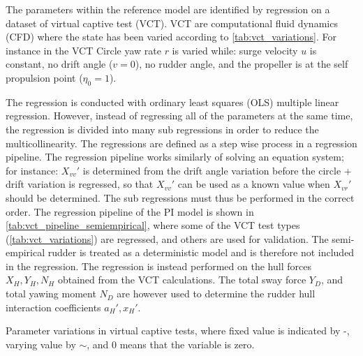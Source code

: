The parameters within the reference model are identified by regression on a dataset \citep{marimon_giovannetti_effects_2020} of virtual captive test (VCT). VCT are computational fluid dynamics (CFD) where the state has been varied according to \autoref{tab:vct_variations}. For instance in the VCT Circle yaw rate $r$ is varied while: surge velocity $u$ is constant, no drift angle ($v=0$), no rudder angle, and the propeller is at the self propulsion point ($\eta_0=1$).

The regression is conducted with ordinary least squares (OLS) multiple linear regression. However, instead of regressing all of the parameters at the same time, the regression is divided into many sub regressions in order to reduce the multicollinearity. The regressions are defined as a step wise process in a regression pipeline. 
The regression pipeline works similarly of solving an equation system; for instance: ${X_{vv}}'$ is determined from the drift angle variation before the circle + drift variation is regressed, so that ${X_{vv}}'$ can be used as a known value when ${X_{vr}}'$ should be determined. The sub regressions must thus be performed in the correct order. 
The regression pipeline of the PI model is shown in \autoref{tab:vct_pipeline_semiempirical}, where some of the VCT test types (\autoref{tab:vct_variations}) are regressed, and others are used for validation. The semi-empirical rudder is treated as a deterministic model and is therefore not included in the regression. The regression is instead performed on the hull forces $X_H,Y_H,N_H$ obtained from the VCT calculations. The total sway force $Y_D$, and total yawing moment $N_D$ are however used to determine the rudder hull interaction coefficients ${a_H}',{x_H}'$. 
\begin{table}[h!]
    \centering
    \caption{Parameter variations in virtual captive tests, where fixed value is indicated by -, varying value by $\sim$, and 0 means that the variable is zero.}
    \label{tab:vct_variations}
\end{table}
